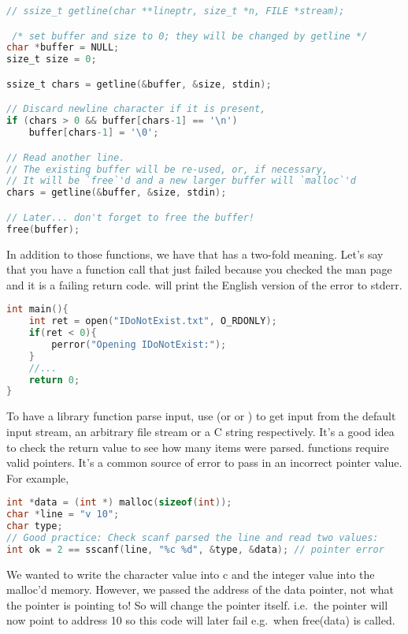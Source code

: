 \begin{lstlisting}[language=C]
// ssize_t getline(char **lineptr, size_t *n, FILE *stream);

 /* set buffer and size to 0; they will be changed by getline */
char *buffer = NULL;
size_t size = 0;

ssize_t chars = getline(&buffer, &size, stdin);

// Discard newline character if it is present,
if (chars > 0 && buffer[chars-1] == '\n') 
    buffer[chars-1] = '\0';

// Read another line.
// The existing buffer will be re-used, or, if necessary,
// It will be `free`'d and a new larger buffer will `malloc`'d
chars = getline(&buffer, &size, stdin);

// Later... don't forget to free the buffer!
free(buffer);
\end{lstlisting}

In addition to those functions, we have  that has a two-fold meaning. Let's say that you have a function call that just failed because you checked the man page and it is a failing return code. will print the English version of the error to stderr.

\begin{lstlisting}[language=C]
int main(){
    int ret = open("IDoNotExist.txt", O_RDONLY);
    if(ret < 0){
        perror("Opening IDoNotExist:");
    }
    //...
    return 0;
}
\end{lstlisting}

To have a library function parse input, use  (or  or ) to get input from the default input stream, an arbitrary file stream or a C string respectively. It's a good idea to check the return value to see how many items were parsed.  functions require valid pointers. It's a common source of error to pass in an incorrect pointer value. For example,

\begin{lstlisting}[language=C]
int *data = (int *) malloc(sizeof(int));
char *line = "v 10";
char type;
// Good practice: Check scanf parsed the line and read two values:
int ok = 2 == sscanf(line, "%c %d", &type, &data); // pointer error
\end{lstlisting}

We wanted to write the character value into c and the integer value into the malloc'd memory. However, we passed the address of the data pointer, not what the pointer is pointing to! So  will change the pointer itself. i.e.~the pointer will now point to address 10 so this code will later fail e.g.~when free(data) is called.

